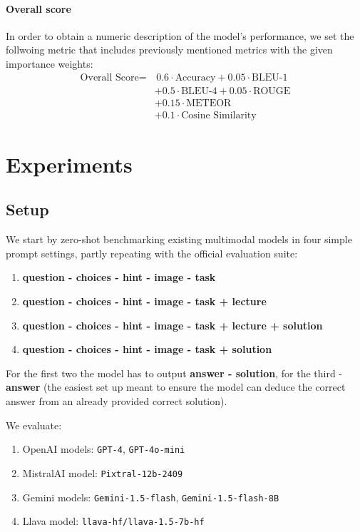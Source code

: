 \documentclass{article}
\begin{document}
\paragraph{Overall score}
In order to obtain a numeric description of the model's performance, we set the follwoing metric that includes previously mentioned metrics with the given importance weights:
\begin{equation*}
\begin{split}
\text{Overall Score} = & \, 0.6 \cdot \text{Accuracy} + 0.05 \cdot \text{BLEU-1} \\
& + 0.5 \cdot \text{BLEU-4} + 0.05 \cdot \text{ROUGE} \\
& + 0.15 \cdot \text{METEOR} \\
& + 0.1 \cdot \text{Cosine Similarity}
\end{split}
\end{equation*}




\section{Experiments}
\label{experiments}

\subsection{Setup}
We start by zero-shot benchmarking existing multimodal models in four simple prompt settings, partly repeating with the official evaluation suite:
\begin{enumerate}
	\item \textbf{question - choices - hint - image - task}
	\item \textbf{question - choices - hint - image - task + lecture}
	\item \textbf{question - choices - hint - image - task + lecture + solution}
	\item \textbf{question - choices - hint - image - task + solution}
\end{enumerate}

For the first two the model has to output \textbf{answer - solution}, for the third - \textbf{answer} (the easiest set up meant to ensure the model can deduce the correct answer from an already provided correct solution). 

We evaluate: 
\begin{enumerate}
	\item OpenAI models: \texttt{GPT-4}, \texttt{GPT-4o-mini}
	\item MistralAI model: \texttt{Pixtral-12b-2409}
    \item Gemini models: \texttt{Gemini-1.5-flash}, \texttt{Gemini-1.5-flash-8B}
	\item Llava model:  \texttt{llava-hf/llava-1.5-7b-hf}
\end{enumerate}
\end{document}
